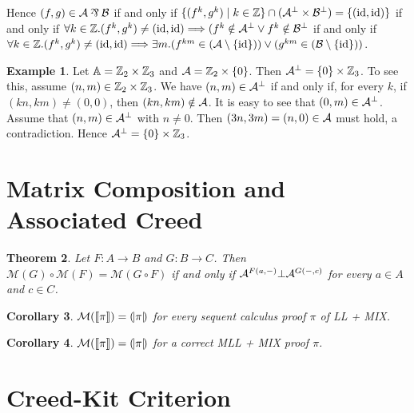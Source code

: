 \documentclass[conference]{IEEEtran}
\theoremstyle{plain}
\newtheorem{theorem}{Theorem}
\newtheorem{corollary}[theorem]{Corollary}
\theoremstyle{definition}
\newtheorem{example}[theorem]{Example}
\theoremstyle{remark}
\begin{document}
Hence \( (f, g) \in \creed \llpar \creedb \) if and only if \( \{ (f^k, g^k) \mid k \in \mathbb{Z} \} \cap (\mathcal{A}^\bot \times \mathcal{B}^\bot) = \{ (\mathrm{id}, \mathrm{id}) \} \) if and only if \( \forall k \in \mathbb{Z}. (f^k, g^k) \neq (\mathrm{id}, \mathrm{id}) \Longrightarrow (f^k \notin \mathcal{A}^\bot \vee f^k \notin \mathcal{B}^\bot \) if and only if \( \forall k \in \mathbb{Z}. (f^k, g^k) \neq (\mathrm{id}, \mathrm{id}) \Longrightarrow \exists m. (f^{km} \in (\mathcal{A} \setminus \{\mathrm{id}\})) \vee (g^{km} \in (\mathcal{B} \setminus \{\mathrm{id}\})) \).

\begin{example}
    Let \( \mathbb{A} = \mathbb{Z}_2 \times \mathbb{Z}_3 \) and \( \mathcal{A} = \mathbb{Z}_2 \times \{0\} \).
    Then \( \mathcal{A}^\bot = \{0\}\times \mathbb{Z}_3 \).
    To see this, assume \( (n,m) \in \mathbb{Z}_2 \times \mathbb{Z}_3 \).
    We have \( (n,m) \in \mathcal{A}^\bot \) if and only if, for every \( k \), if \( (kn, km) \neq (0,0) \), then \( (kn, km) \notin \mathcal{A} \).
    It is easy to see that \( (0,m) \in \mathcal{A}^\bot \).
    Assume that \( (n,m) \in \mathcal{A}^\bot \) with \( n \neq 0 \).
    Then \( (3n, 3m) = (n, 0) \in \mathcal{A} \) must hold, a contradiction.
    Hence \( \mathcal{A}^\bot = \{ 0 \} \times \mathbb{Z}_3 \).
\end{example}


\section{Matrix Composition and Associated Creed}

\newcommand{\MatTrans}[1]{\mathcal{M}({#1})}
\newcommand{\ProfArrow}{\longrightarrow}
\begin{theorem}
    Let \( F \colon A \ProfArrow B \) and \( G \colon B \ProfArrow C \).
    Then \( \MatTrans{G} \circ \MatTrans{F} = \MatTrans{G \circ F} \) if and only if \( \mathcal{A}^{F(a, {-})} \bot \mathcal{A}^{G({-}, c)} \) for every \( a \in A \) and \( c \in C \).
\end{theorem}
\newcommand{\rsem}[1]{(\!|{#1}|\!)}
\begin{corollary}
    \( \MatTrans{\sem{\pi}} = \rsem{\pi} \) for every sequent calculus proof \( \pi \) of LL + MIX.
\end{corollary}
\begin{corollary}
    \( \MatTrans{\sem{\pi}} = \rsem{\pi} \) for a correct MLL + MIX proof \( \pi \). 
\end{corollary}


\section{Creed-Kit Criterion}
\end{document}
